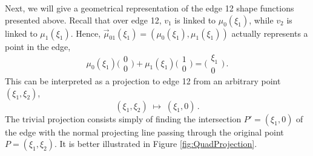 Next, we will give a geometrical representation of the edge 12 shape functions presented above.
Recall that over edge 12, $v_1$ is linked to $\mu_0(\xi_1)$, while $v_2$ is linked to $\mu_1(\xi_1)$. 
Hence, $\vec{\mu}_{01}(\xi_1)=(\mu_0(\xi_1),\mu_1(\xi_1))$ actually represents a point in the edge,
\begin{equation*}
	\mu_0(\xi_1)\Big(\begin{smallmatrix}0\\[2pt]0\end{smallmatrix}\Big)
		+\mu_1(\xi_1)\Big(\begin{smallmatrix}1\\[2pt]0\end{smallmatrix}\Big)
			=\Big(\begin{smallmatrix}\xi_1\\[2pt]0\end{smallmatrix}\Big)\,.
\end{equation*} 
This can be interpreted as a projection to edge 12 from an arbitrary point $(\xi_1,\xi_2)$,
\begin{equation*}
    (\xi_1,\xi_2)\;\longmapsto\;(\xi_1,0)\,.
\end{equation*}
The trivial projection consists simply of finding the intersection $P'=(\xi_1,0)$ of the edge with the normal projecting line passing through the original point $P=(\xi_1,\xi_2)$. 
It is better illustrated in Figure \ref{fig:QuadProjection}.

